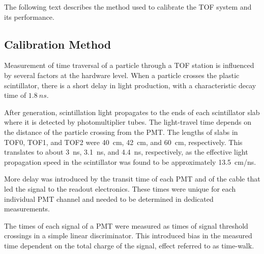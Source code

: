 The following text describes the method used to calibrate the TOF
system and its performance.


\subsection{Calibration Method}

Measurement of time traversal of a particle through a TOF station is
influenced by several factors at the hardware level. When a particle
crosses the plastic scintillator, there is a short delay in light
production, with a characteristic decay time of $1.8~ns$.

After generation, scintillation light propagates to the ends of each
scintillator slab where it is detected by photomultiplier tubes. The
light-travel time depends on the distance of the particle crossing
from the PMT. The lengths of slabs in TOF0, TOF1, and TOF2 were 40~cm,
42~cm, and 60~cm, respectively. This translates to about 3~ns, 3.1~ns,
and 4.4~ns, respectively, as the effective light propagation speed in
the scintillator was found to be approximately 13.5~cm/ns.

More delay was introduced by the transit time of each PMT and of the
cable that led the signal to the readout electronics. These times were
unique for each individual PMT channel and needed to be determined in
dedicated measurements.

The times of each signal of a PMT were measured as times of signal threshold
crossings in a simple linear discriminator. This introduced bias in
the measured time dependent on the total charge of the signal, effect
referred to as time-walk.

